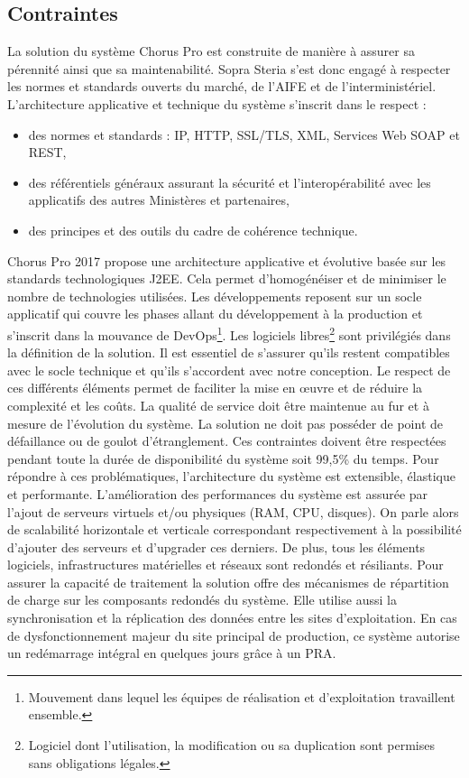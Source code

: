 \documentclass[12pt,a4paper]{article}
\begin{document}
\subsection{Contraintes}
La solution du système Chorus Pro est construite de manière à assurer sa pérennité ainsi que sa maintenabilité. Sopra Steria s'est donc engagé à respecter les normes et standards ouverts du marché, de l'\gls{AIFE} et de l'interministériel. L’architecture applicative et technique du système s’inscrit dans le respect :
\smallbreak
\begin{itemize}
\item	des normes et standards : IP, HTTP, SSL/TLS, \gls{XML}, Services Web \gls{SOAP} et \gls{REST},
\item	des référentiels généraux assurant la sécurité et l’interopérabilité avec les applicatifs des autres Ministères et partenaires,
\item	des principes et des outils du cadre de cohérence technique.
\end{itemize}
\medbreak
Chorus Pro 2017 propose une architecture applicative et évolutive basée sur les standards technologiques \gls{J2EE}. Cela permet d'homogénéiser et de minimiser le nombre de technologies utilisées. Les développements reposent sur un socle applicatif qui couvre les phases allant du développement à la production et s’inscrit dans la mouvance de DevOps\footnote{Mouvement dans lequel les équipes de réalisation et d'exploitation travaillent ensemble.}. Les logiciels libres\footnote{Logiciel dont l'utilisation, la modification ou sa duplication sont permises sans obligations légales.} sont privilégiés dans la définition de la solution. Il est essentiel de s'assurer qu’ils restent compatibles avec le socle technique et qu'ils s'accordent avec notre conception. Le respect de ces différents éléments permet de faciliter la mise en œuvre et de réduire la complexité et les coûts.
\smallbreak
La qualité de service doit être maintenue au fur et à mesure de l’évolution du système. La solution ne doit pas posséder de point de défaillance ou de goulot d'étranglement. Ces contraintes doivent être respectées pendant toute la durée de disponibilité du système soit 99,5\% du temps. Pour répondre à ces problématiques, l'architecture du système est extensible, élastique et performante. L'amélioration des performances du système est assurée par l'ajout de serveurs virtuels et/ou physiques (\gls{RAM}, \gls{CPU}, disques). On parle alors de scalabilité horizontale et verticale correspondant respectivement à la possibilité d'ajouter des serveurs et d'upgrader ces derniers.
\smallbreak
De plus, tous les éléments logiciels, infrastructures matérielles et réseaux sont redondés et résiliants. Pour assurer la capacité de traitement la solution offre des mécanismes de répartition de charge sur les composants redondés du système. Elle utilise aussi la synchronisation et la réplication des données entre les sites d’exploitation. En cas de dysfonctionnement majeur du site principal de production, ce système autorise un redémarrage intégral en quelques jours grâce à un \gls{PRA}.  
\end{document}
